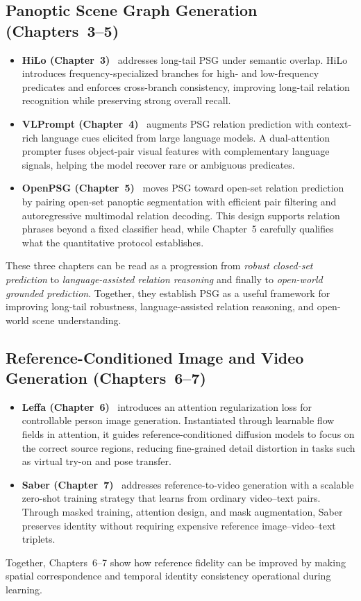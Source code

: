 \subsection{Panoptic Scene Graph Generation (Chapters~3--5)}
\begin{itemize}
    \item \textbf{HiLo (Chapter~3)}~\citep{zhou2023hilo} addresses long-tail PSG under semantic overlap. HiLo introduces frequency-specialized branches for high- and low-frequency predicates and enforces cross-branch consistency, improving long-tail relation recognition while preserving strong overall recall.
    \item \textbf{VLPrompt (Chapter~4)}~\citep{zhou2025vlprompt} augments PSG relation prediction with context-rich language cues elicited from large language models. A dual-attention prompter fuses object-pair visual features with complementary language signals, helping the model recover rare or ambiguous predicates.
    \item \textbf{OpenPSG (Chapter~5)}~\citep{zhou2025openpsg} moves PSG toward open-set relation prediction by pairing open-set panoptic segmentation with efficient pair filtering and autoregressive multimodal relation decoding. This design supports relation phrases beyond a fixed classifier head, while Chapter~5 carefully qualifies what the quantitative protocol establishes.
\end{itemize}
\noindent These three chapters can be read as a progression from \emph{robust closed-set prediction} to \emph{language-assisted relation reasoning} and finally to \emph{open-world grounded prediction}. Together, they establish PSG as a useful framework for improving long-tail robustness, language-assisted relation reasoning, and open-world scene understanding.

\subsection{Reference-Conditioned Image and Video Generation (Chapters~6--7)}
\begin{itemize}
    \item \textbf{Leffa (Chapter~6)}~\citep{zhou2025learning} introduces an attention regularization loss for controllable person image generation. Instantiated through learnable flow fields in attention, it guides reference-conditioned diffusion models to focus on the correct source regions, reducing fine-grained detail distortion in tasks such as virtual try-on and pose transfer.
    \item \textbf{Saber (Chapter~7)}~\citep{zhou2025scaling} addresses reference-to-video generation with a scalable zero-shot training strategy that learns from ordinary video--text pairs. Through masked training, attention design, and mask augmentation, Saber preserves identity without requiring expensive reference image--video--text triplets.
\end{itemize}
\noindent Together, Chapters~6--7 show how reference fidelity can be improved by making spatial correspondence and temporal identity consistency operational during learning.

